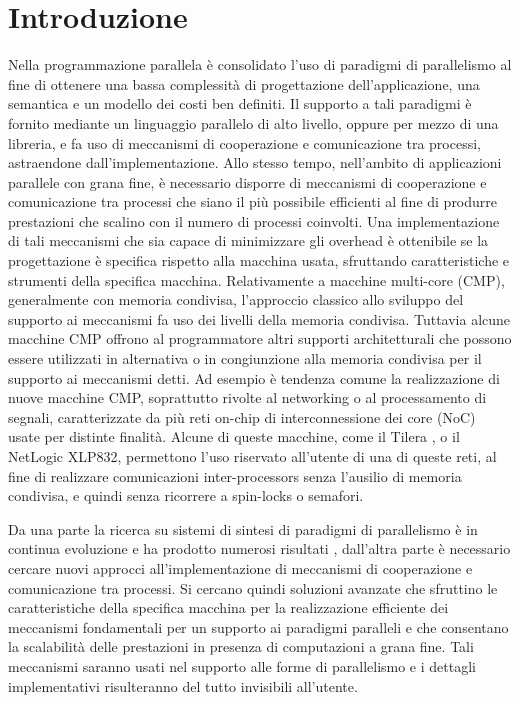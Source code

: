 \section{Introduzione}
\label{sct:intro_intro}

Nella programmazione parallela \`e consolidato l'uso di paradigmi di parallelismo \cite{mattson2004patterns} al fine di ottenere una bassa complessit\`a di progettazione dell'applicazione, una semantica e un modello dei costi ben definiti. Il supporto a tali paradigmi \`e fornito mediante  un linguaggio parallelo di alto livello, oppure per mezzo di una libreria, e fa uso di meccanismi di cooperazione e comunicazione tra processi, astraendone dall'implementazione.
Allo stesso tempo, nell'ambito di applicazioni parallele con grana fine, \`e necessario disporre di meccanismi di cooperazione e comunicazione tra processi che siano il pi\`u possibile efficienti al fine di produrre prestazioni che scalino con il numero di processi coinvolti. Una implementazione di tali meccanismi che sia capace di minimizzare gli overhead \`e ottenibile se la progettazione \`e specifica rispetto alla macchina usata, sfruttando caratteristiche e strumenti della specifica macchina. 
Relativamente a macchine multi-core (CMP), generalmente con memoria condivisa, l'approccio classico allo sviluppo del supporto ai meccanismi fa uso dei livelli della memoria condivisa. Tuttavia alcune macchine CMP offrono al programmatore altri supporti architetturali che possono essere utilizzati in alternativa o in congiunzione alla memoria condivisa per il supporto ai meccanismi detti. 
Ad esempio \`e tendenza comune la realizzazione di nuove macchine CMP, soprattutto rivolte al networking o al processamento di segnali, caratterizzate da pi\`u reti on-chip di interconnessione dei core (NoC) usate per distinte finalit\`a. Alcune di queste macchine, come il Tilera \tile, o il NetLogic XLP832, permettono l'uso riservato all'utente di una di queste reti, al fine di realizzare comunicazioni inter-processors senza l'ausilio di memoria condivisa, e quindi senza ricorrere a spin-locks o semafori.

Da una parte la ricerca su sistemi di sintesi di paradigmi di parallelismo \`e in continua evoluzione e ha prodotto numerosi risultati \cite{cole2004bringing,gonzalez2010survey}, dall'altra parte \`e necessario cercare nuovi approcci all'implementazione di meccanismi di cooperazione e comunicazione tra processi. Si cercano quindi soluzioni avanzate che sfruttino le caratteristiche della specifica macchina per la realizzazione efficiente dei meccanismi fondamentali per un supporto ai paradigmi paralleli e che consentano la scalabilit\`a delle prestazioni in presenza di computazioni a grana fine.
Tali meccanismi saranno usati nel supporto alle forme di parallelismo e i dettagli implementativi risulteranno del tutto invisibili all'utente.  \\


